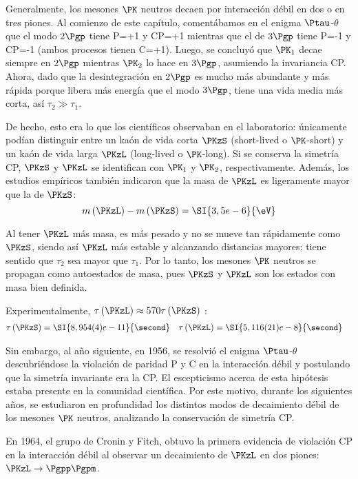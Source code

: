 Generalmente, los mesones $\PK$ neutros decaen por interacción débil en dos o en tres piones. Al comienzo de este capítulo, comentábamos en el enigma $\Ptau$-$\theta$ que el modo $2\Pgp$ tiene P=+1 y CP=+1 mientras que el de $3\Pgp$ tiene P=-1 y CP=-1 (ambos procesos tienen C=+1). Luego, se concluyó que $\PK_{1}$ decae siempre en $2\Pgp$ mientras $\PK_{2}$ lo hace en $3\Pgp$, asumiendo la invariancia CP. Ahora, dado que la desintegración en $2\Pgp$ es mucho más abundante y más rápida porque libera más energía que el modo $3\Pgp$, tiene una vida media más corta, así $\tau_{2} \gg \tau_{1}$. 

De hecho, esto era lo que los científicos observaban en el laboratorio: únicamente podían distinguir entre un kaón de vida corta $\PKzS$ (short-lived o $\PK$-short) y un kaón de vida larga $\PKzL$ (long-lived o $\PK$-long). Si se conserva la simetría CP, $\PKzS$ y $\PKzL$ se identifican con $\PK_{1}$ y $\PK_{2}$, respectivamente. Además, los estudios empíricos también indicaron que la masa de $\PKzL$ es ligeramente mayor que la de $\PKzS$: 
\begin{equation}
m\left(\PKzL\right)-m\left(\PKzS\right)=\SI{3,5e-6}{\eV}
\end{equation}

Al tener $\PKzL$ más masa, es más pesado y no se mueve tan rápidamente como $\PKzS$, siendo así $\PKzL$ más estable y alcanzando distancias mayores; tiene sentido que $\tau_{2}$ sea mayor que $\tau_{1}$. Por lo tanto, los mesones $\PK$ neutros se propagan como autoestados de masa, pues $\PKzS$ y $\PKzL$ son los estados con masa bien definida.

Experimentalmente, $\tau\left(\PKzL\right) \approx 570\tau\left(\PKzS\right)$ \cite{Zyla}:
\begin{align}
\tau\left(\PKzS\right) &= \SI{8,954(4)e-11}{\second} & \tau\left(\PKzL\right) &= \SI{5,116(21)e-8}{\second}
\end{align}

Sin embargo, al año siguiente, en 1956, se resolvió el enigma $\Ptau$-$\theta$ descubriéndose la violación de paridad P y C en la interacción débil y postulando que la simetría invariante era la CP. El escepticismo acerca de esta hipótesis estaba presente en la comunidad científica. Por este motivo, durante los siguientes años, se estudiaron en profundidad los distintos modos de decaimiento débil de los mesones $\PK$ neutros, analizando la conservación de simetría CP.

En 1964, el grupo de Cronin y Fitch, obtuvo la primera evidencia de violación CP en la interacción débil al observar un decaimiento de $\PKzL$ en dos piones: $\PKzL \rightarrow \Pgpp\Pgpm$.

